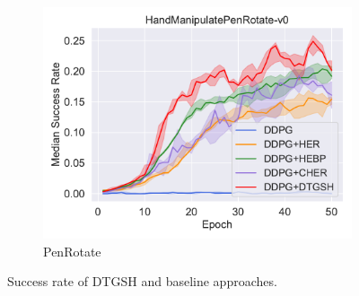 \begin{figure}
\begin{subfigure}[t]{0.49\textwidth}
    \includegraphics[width=\textwidth]{figures/chapter4/HandManipulatePenRotate-v0.pdf}
    \caption{PenRotate}
    \label{subfig:baseline_handpen}
  \end{subfigure}\hfill
  \caption{Success rate of DTGSH and baseline approaches. } 
  \label{fig:baseline_compare_c4}
\end{figure}

